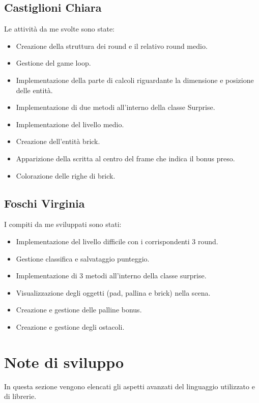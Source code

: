 \documentclass[a4paper,12pt]{report}
\begin{document}
\subsection{Castiglioni Chiara}
Le attività da me svolte sono state:
\begin{itemize}
    \item Creazione della struttura dei round e il relativo round medio.
    \item Gestione del game loop.
    \item Implementazione della parte di calcoli riguardante la dimensione e posizione delle entità.
    \item Implementazione di due metodi all'interno della classe Surprise.
    \item Implementazione del livello medio.
    \item Creazione dell'entità brick.
    \item Apparizione della scritta al centro del frame che indica il bonus preso.
    \item Colorazione delle righe di brick.
\end{itemize}
\subsection{Foschi Virginia}
I compiti da me sviluppati sono stati:
\begin{itemize}
    \item Implementazione del livello difficile con i corrispondenti 3 round.
    \item Gestione classifica e salvataggio punteggio.
    \item Implementazione di 3 metodi all'interno della classe surprise.
    \item Visualizzazione degli oggetti (pad, pallina e brick) nella scena.
    \item Creazione e gestione delle palline bonus.
    \item Creazione e gestione degli ostacoli.
\end{itemize}
\section{Note di sviluppo}
In questa sezione vengono elencati gli aspetti avanzati del linguaggio utilizzato e di librerie.
\end{document}

